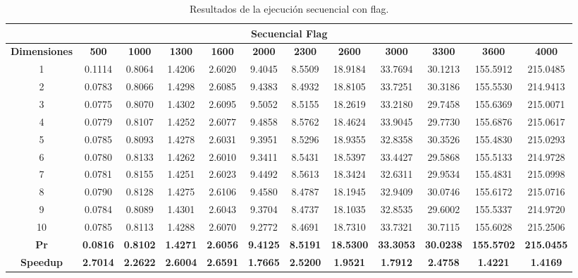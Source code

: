 \documentclass{article}
\begin{document}
\begin{table}[H]
\centering
\tiny
\begin{tabular}{|c|c|c|c|c|c|c|c|c|c|c|c|}
\hline
\multicolumn{12}{|c|}{\textbf{Secuencial Flag}} \\
\hline
\textbf{Dimensiones} & \textbf{500} & \textbf{1000} & \textbf{1300} & \textbf{1600} & \textbf{2000} & \textbf{2300} & \textbf{2600} & \textbf{3000} & \textbf{3300} & \textbf{3600} & \textbf{4000} \\
\hline
1  & 0.1114 & 0.8064 & 1.4206 & 2.6020 & 9.4045 & 8.5509 & 18.9184 & 33.7694 & 30.1213 & 155.5912 & 215.0485 \\
2  & 0.0783 & 0.8066 & 1.4298 & 2.6085 & 9.4383 & 8.4932 & 18.8105 & 33.7251 & 30.3186 & 155.5530 & 214.9413 \\
3  & 0.0775 & 0.8070 & 1.4302 & 2.6095 & 9.5052 & 8.5155 & 18.2619 & 33.2180 & 29.7458 & 155.6369 & 215.0071 \\
4  & 0.0779 & 0.8107 & 1.4252 & 2.6077 & 9.4858 & 8.5762 & 18.4624 & 33.9045 & 29.7730 & 155.6876 & 215.0617 \\
5  & 0.0785 & 0.8093 & 1.4278 & 2.6031 & 9.3951 & 8.5296 & 18.9355 & 32.8358 & 30.3526 & 155.4830 & 215.0293 \\
6  & 0.0780 & 0.8133 & 1.4262 & 2.6010 & 9.3411 & 8.5431 & 18.5397 & 33.4427 & 29.5868 & 155.5133 & 214.9728 \\
7  & 0.0781 & 0.8155 & 1.4251 & 2.6023 & 9.4492 & 8.5613 & 18.3424 & 32.6311 & 29.9534 & 155.4831 & 215.0998 \\
8  & 0.0790 & 0.8128 & 1.4275 & 2.6106 & 9.4580 & 8.4787 & 18.1945 & 32.9409 & 30.0746 & 155.6172 & 215.0716 \\
9  & 0.0784 & 0.8089 & 1.4301 & 2.6043 & 9.3704 & 8.4737 & 18.1035 & 32.8535 & 29.6002 & 155.5337 & 214.9720 \\
10 & 0.0785 & 0.8113 & 1.4288 & 2.6070 & 9.2772 & 8.4691 & 18.7310 & 33.7321 & 30.7115 & 155.6028 & 215.2506 \\
\hline
\textbf{Pr} & \textbf{0.0816} & \textbf{0.8102} & \textbf{1.4271} & \textbf{2.6056} & \textbf{9.4125} & \textbf{8.5191} & \textbf{18.5300} & \textbf{33.3053} & \textbf{30.0238} & \textbf{155.5702} & \textbf{215.0455} \\
\hline
\textbf{Speedup} & \textbf{2.7014} & \textbf{2.2622} & \textbf{2.6004} & \textbf{2.6591} & \textbf{1.7665} & \textbf{2.5200} & \textbf{1.9521} & \textbf{1.7912} & \textbf{2.4758} & \textbf{1.4221} & \textbf{1.4169} \\
\hline
\end{tabular}
\label{tab:secuencial_flag}

\caption{Resultados de la ejecución secuencial con flag.}
\end{table}
\end{document}
